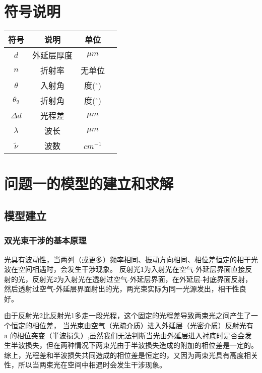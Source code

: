 \documentclass{cumcmthesis}
\begin{document}

\section{符号说明}
\begin{table}[H]
\centering
\begin{tabularx}{\textwidth}{CCCC}%
\toprule
符号    & 说明    & 单位    \\
\midrule
$d$     & 外延层厚度 & $\mu m$ \\
$n$     & 折射率 & 无单位 \\
$\theta$ & 入射角 & 度($^\circ$) \\
$\theta_2$ & 折射角 & 度($^\circ$) \\
$\Delta d$ & 光程差 & $\mu m$ \\
$\lambda$ & 波长 & $\mu m$ \\
$\tilde{\nu}$ & 波数 & $cm^{-1}$ \\
\bottomrule
\end{tabularx}
\label{tab:符号说明}
\end{table}

\section{问题一的模型的建立和求解}
\subsection{模型建立}
\subsubsection{双光束干涉的基本原理}
光具有波动性，当两列（或更多）频率相同、振动方向相同、相位差恒定的相干光波在空间相遇时，会发生干涉现象。
反射光1为入射光在空气-外延层界面直接反射的光，反射光2为入射光在透射过空气-外延层界面，在外延层-衬底界面反射，然后透射过空气-外延层界面射出的光，两光束实际为同一光源发出，相干性良好。

由于反射光2比反射光1多走一段光程，这个固定的光程差导致两束光之间产生了一个恒定的相位差， 
当光束由空气（光疏介质）进入外延层（光密介质）反射光有 π 的相位突变（半波损失）,虽然我们无法判断当光由外延层进入衬底时是否会发生半波损失，但在两种情况下两束光由于半波损失造成的附加的相位差是一定的。综上，光程差和半波损失共同造成的相位差是恒定的，又因为两束光具有高度相关性，所以当两束光在空间中相遇时会发生干涉现象。
\end{document}
